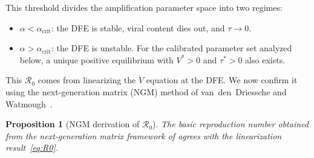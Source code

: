 \documentclass[11pt]{article}
\newtheorem{proposition}{Proposition}
\begin{document}
This threshold divides the amplification parameter space into two regimes:
\begin{itemize}[leftmargin=1.5em]
    \item $\alpha < \alpha_{\mathrm{crit}}$: the DFE is stable, viral content dies out, and $\tau \to 0$.
    \item $\alpha > \alpha_{\mathrm{crit}}$: the DFE is unstable. For the calibrated parameter set analyzed below, a unique positive equilibrium with $V^* > 0$ and $\tau^* > 0$ also exists.
\end{itemize}

This $\mathcal{R}_0$ comes from linearizing the $\dot{V}$ equation at the DFE. We now confirm it using the next-generation matrix (NGM) method of van~den~Driessche and Watmough~\cite{vandenDriessche2002}.

\begin{proposition}[NGM derivation of $\mathcal{R}_0$]
\label{prop:ngm}
The basic reproduction number obtained from the next-generation matrix framework of \cite{vandenDriessche2002} agrees with the linearization result~\eqref{eq:R0}.
\end{proposition}
\end{document}
